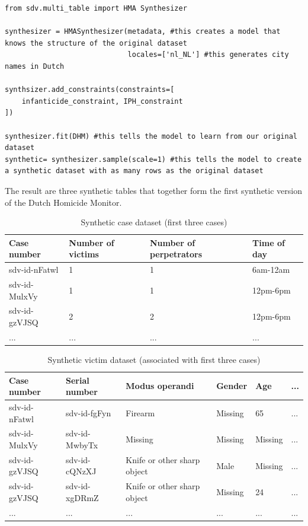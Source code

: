 \vspace{10pt}
\begin{lstlisting}[caption={Synthetic Data Generation: First Attempt}, label={lst:gen_first}]
from sdv.multi_table import HMA Synthesizer

synthesizer = HMASynthesizer(metadata, #this creates a model that knows the structure of the original dataset
                             locales=['nl_NL'] #this generates city names in Dutch

synthsizer.add_constraints(constraints=[
    infanticide_constraint, IPH_constraint
])

synthesizer.fit(DHM) #this tells the model to learn from our original dataset
synthetic= synthesizer.sample(scale=1) #this tells the model to create a synthetic dataset with as many rows as the original dataset
\end{lstlisting}
\vspace{10pt}

The result are three synthetic tables that together form the first synthetic version of the Dutch Homicide Monitor.

\vspace{10pt}
\begin{table}[]
\small
\begin{tabular}{@{}llll@{}}
\midrule
Case number   & Number of victims & Number of perpetrators & Time of day \\ \midrule
sdv-id-nFatwl & 1                 & 1                      & 6am-12am    \\
sdv-id-MulxVy & 1                 & 1                      & 12pm-6pm    \\
sdv-id-gzVJSQ & 2                 & 2                      & 12pm-6pm    \\
...           & ...               & ...                    & ...    \\ \bottomrule    
\end{tabular}
\caption{Synthetic case dataset (first three cases)}
\label{tab:my-table}
\end{table}
\vspace{5pt}

\begin{table}[]
\small
\begin{tabular}{@{}llllll@{}}
\toprule
Case number   & Serial number & Modus operandi              & Gender  & Age     & ... \\ \midrule
sdv-id-nFatwl & sdv-id-fgFyn  & Firearm                     & Missing & 65      & ... \\
sdv-id-MulxVy & sdv-id-MwbyTx & Missing                     & Missing & Missing & ... \\
sdv-id-gzVJSQ & sdv-id-cQNzXJ & Knife or other sharp object & Male    & Missing & ... \\
sdv-id-gzVJSQ & sdv-id-xgDRmZ & Knife or other sharp object & Missing & 24      & ... \\
...           & ...           & ...                         & ...     & ...     & ... \\ \bottomrule
\end{tabular}
\caption{Synthetic victim dataset (associated with first three cases)}
\label{tab:my-table}
\end{table}

